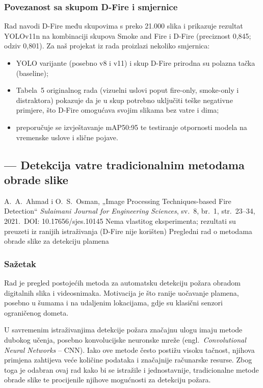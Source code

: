 \subsubsection{Povezanost sa skupom D-Fire i smjernice}
Rad navodi D-Fire među skupovima s preko 21.000 slika i prikazuje rezultat YOLOv11n na kombinaciji skupova Smoke and Fire i D-Fire (preciznost 0,845; odziv 0,801). Za naš projekat iz rada proizlazi nekoliko smjernica:
\begin{itemize}
  \item YOLO varijante (posebno v8 i v11) i skup D-Fire prirodna su polazna tačka (baseline);
  \item Tabela~5 originalnog rada (vizuelni uslovi poput fire-only, smoke-only i distraktora) pokazuje da je u skup potrebno uključiti teške negativne primjere, što D-Fire omogućava svojim slikama bez vatre i dima;
  \item preporučuje se izvještavanje mAP50:95 te testiranje otpornosti modela na vremenske uslove i slične pojave.
\end{itemize}

\clearpage
\subsection{\texorpdfstring{\AutorB}{Aldin Velić} --- Detekcija vatre tradicionalnim metodama obrade slike}

\paperbox{\AutorB}
  {A.\ A.\ Ahmad i O.\ S.\ Osman, „Image Processing Techniques-based Fire Detection“ \cite{ahmad}}
  {\emph{Sulaimani Journal for Engineering Sciences}, sv.\ 8, br.\ 1, str.\ 23--34, 2021.\ DOI: 10.17656/sjes.10145}
  {Nema vlastitog eksperimenta; rezultati su preuzeti iz ranijih istraživanja (D-Fire nije korišten)}
  {Pregledni rad o metodama obrade slike za detekciju plamena}

\subsubsection{Sažetak}
Rad je pregled postojećih metoda za automatsku detekciju požara obradom digitalnih slika i videosnimaka. Motivacija je što ranije uočavanje plamena, posebno u šumama i na udaljenim lokacijama, gdje su klasični senzori ograničenog dometa.

U savremenim istraživanjima detekcije požara značajnu ulogu imaju metode dubokog učenja, posebno konvolucijske neuronske mreže (engl.\ \emph{Convolutional Neural Networks} -- CNN). Iako ove metode često postižu visoku tačnost, njihova primjena zahtijeva veće količine podataka i značajnije računarske resurse. Zbog toga je odabran ovaj rad kako bi se istražile i jednostavnije, tradicionalne metode obrade slike te procijenile njihove mogućnosti za detekciju požara.


